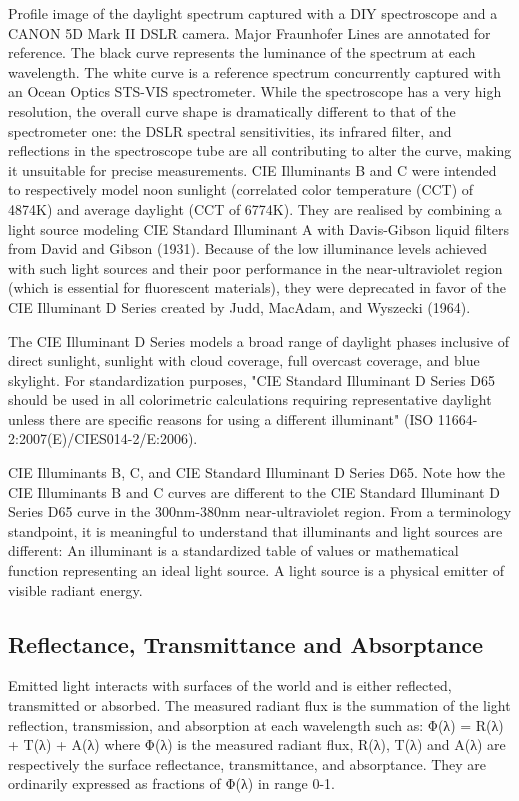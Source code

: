 Profile image of the daylight spectrum captured with a DIY spectroscope and a CANON 5D Mark II DSLR camera. Major Fraunhofer Lines are annotated for reference. The black curve represents the luminance of the spectrum at each wavelength. The white curve is a reference spectrum concurrently captured with an Ocean Optics STS-VIS spectrometer. While the spectroscope has a very high resolution, the overall curve shape is dramatically different to that of the spectrometer one: the DSLR spectral sensitivities, its infrared filter, and reflections in the spectroscope tube are all contributing to alter the curve, making it unsuitable for precise measurements.
CIE Illuminants B and C were intended to respectively model noon sunlight (correlated color temperature (CCT) of 4874K) and average daylight (CCT of 6774K). They are realised by combining a light source modeling CIE Standard Illuminant A with Davis-Gibson liquid filters from David and Gibson (1931). Because of the low illuminance levels achieved with such light sources and their poor performance in the near-ultraviolet region (which is essential for fluorescent materials), they were deprecated in favor of the CIE Illuminant D Series created by Judd, MacAdam, and Wyszecki (1964). 

The CIE Illuminant D Series models a broad range of daylight phases inclusive of direct sunlight, sunlight with cloud coverage, full overcast coverage, and blue skylight. For standardization purposes, "CIE Standard Illuminant D Series D65 should be used in all colorimetric calculations requiring representative daylight unless there are specific reasons for using a different illuminant" (ISO 11664-2:2007(E)/CIES014-2/E:2006).

CIE Illuminants B, C, and CIE Standard Illuminant D Series D65. Note how the CIE Illuminants B and C curves are different to the CIE Standard Illuminant D Series D65 curve in the 300nm-380nm near-ultraviolet region.
From a terminology standpoint, it is meaningful to understand that illuminants and light sources are different:
An illuminant is a standardized table of values or mathematical function representing an ideal light source.
A light source is a physical emitter of visible radiant energy.

\subsection{Reflectance, Transmittance and Absorptance}

Emitted light interacts with surfaces of the world and is either reflected, transmitted or absorbed. The measured radiant flux is the summation of the light reflection, transmission, and absorption at each wavelength such as:
Φ(λ) = R(λ) + T(λ) + A(λ)
where Φ(λ) is the measured radiant flux, R(λ), T(λ) and A(λ) are respectively the surface reflectance, transmittance, and absorptance. They are ordinarily expressed as fractions of Φ(λ) in range 0-1.

